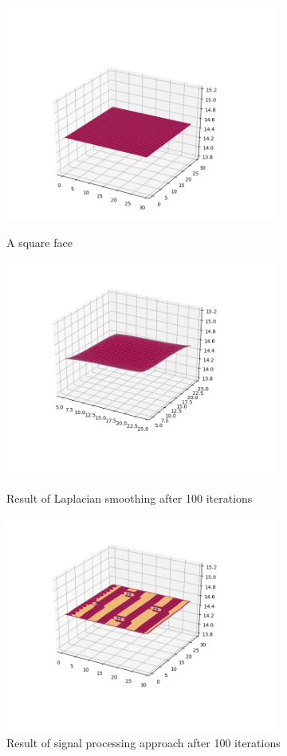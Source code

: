 \documentclass[conference]{IEEEtran}
\begin{document}
\begin{figure}
	\includegraphics[width=3.5in]{7.png}
	\caption{A square face}
	\label{7png}

	\includegraphics[width=3.5in]{5.png}
	\caption{Result of Laplacian smoothing after 100 iterations}
	\label{5png}

	\includegraphics[width=3.5in]{6.png}
	\caption{Result of signal processing approach after 100 iterations}
	\label{6png}
\end{figure}
\end{document}
